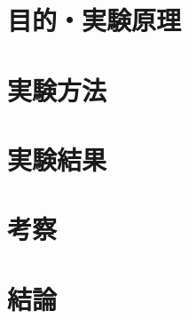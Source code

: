 \documentclass[platex,dvipdfmx]{jlreq}
\begin{document}
\section{目的・実験原理}

\clearpage
\section{実験方法}

\clearpage
\section{実験結果}

\clearpage
\section{考察}

\clearpage
\section{結論}



\end{document}
